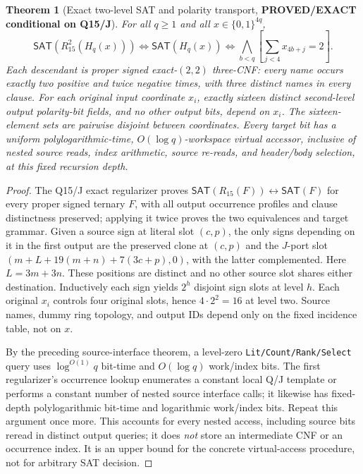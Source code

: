 \documentclass[11pt]{article}
\newtheorem{theorem}{Theorem}
\newcommand{\SAT}{\mathsf{SAT}}
\begin{document}
\begin{theorem}[Exact two-level SAT and polarity transport, \textbf{PROVED/EXACT conditional on Q15/J}]
For all $q\ge1$ and all $x\in\{0,1\}^{4q}$,
\[
\SAT(R_{15}^2(H_q(x)))\iff\SAT(H_q(x))\iff\bigwedge_{b<q}\left[\sum_{j<4}x_{4b+j}=2\right].
\]
Each descendant is proper signed exact-$(2,2)$ three-CNF: every name occurs exactly two positive and twice negative times, with three distinct names in every clause. For each original input coordinate $x_i$, exactly sixteen distinct second-level output \emph{polarity-bit fields}, and no other output bits, depend on $x_i$. The sixteen-element sets are pairwise disjoint between coordinates. Every target bit has a uniform polylogarithmic-time, $O(\log q)$-workspace virtual accessor, inclusive of nested source reads, index arithmetic, source re-reads, and header/body selection, at this fixed recursion depth.
\end{theorem}
\begin{proof}
The Q15/J exact regularizer proves $\SAT(R_{15}(F))\leftrightarrow\SAT(F)$ for every proper signed ternary $F$, with all output occurrence profiles and clause distinctness preserved; applying it twice proves the two equivalences and target grammar. Given a source sign at literal slot $(c,p)$, the only signs depending on it in the first output are the preserved clone at $(c,p)$ and the $J$-port slot $(m+L+19(m+n)+7(3c+p),0)$, with the latter complemented. Here $L=3m+3n$. These positions are distinct and no other source slot shares either destination. Inductively each sign yields $2^h$ disjoint sign slots at level $h$. Each original $x_i$ controls four original slots, hence $4\cdot2^2=16$ at level two. Source names, dummy ring topology, and output IDs depend only on the fixed incidence table, not on $x$.

By the preceding source-interface theorem, a level-zero \texttt{Lit/Count/Rank/Select} query uses $\log^{O(1)}q$ bit-time and $O(\log q)$ work/index bits. The first regularizer's occurrence lookup enumerates a constant local Q/J template or performs a constant number of nested source interface calls; it likewise has fixed-depth polylogarithmic bit-time and logarithmic work/index bits. Repeat this argument once more. This accounts for every nested access, including source bits reread in distinct output queries; it does \emph{not} store an intermediate CNF or an occurrence index. It is an upper bound for the concrete virtual-access procedure, not for arbitrary SAT decision.
\end{proof}
\end{document}
